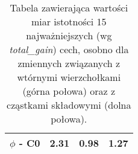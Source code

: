 \begin{table}
\begin{tabular}{lrrr}
$\phi$ - C0   &         2.31 &             0.98 &              1.27 \\
\bottomrule
\end{tabular}
\caption{Tabela zawierająca wartości miar istotności 15 najważniejszych (wg \textit{total\_gain}) cech, osobno dla zmiennych związanych z wtórnymi wierzchołkami (górna połowa) oraz z cząstkami składowymi (dolna połowa).}
\label{tab:feat_imp_most_sv_constit}
\end{table}



